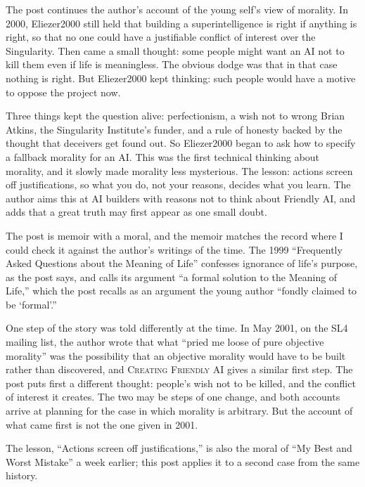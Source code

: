 \begin{afterword}
\summaryhead

The post continues the author's account of the young self's view of morality. In 2000, Eliezer2000 still held that building a superintelligence is right if anything is right, so that no one could have a justifiable conflict of interest over the Singularity. Then came a small thought: some people might want an AI not to kill them even if life is meaningless. The obvious dodge was that in that case nothing is right. But Eliezer2000 kept thinking: such people would have a motive to oppose the project now.

Three things kept the question alive: perfectionism, a wish not to wrong Brian Atkins, the Singularity Institute's funder, and a rule of honesty backed by the thought that deceivers get found out. So Eliezer2000 began to ask how to specify a fallback morality for an AI. This was the first technical thinking about morality, and it slowly made morality less mysterious. The lesson: actions screen off justifications, so what you do, not your reasons, decides what you learn. The author aims this at AI builders with reasons not to think about Friendly AI, and adds that a great truth may first appear as one small doubt.

\responsehead

The post is memoir with a moral, and the memoir matches the record where I could check it against the author's writings of the time. The 1999 ``Frequently Asked Questions about the Meaning of Life'' confesses ignorance of life's purpose, as the post says, and calls its argument ``a formal solution to the Meaning of Life,'' which the post recalls as an argument the young author ``fondly claimed to be `formal'.''

One step of the story was told differently at the time. In May 2001, on the SL4 mailing list, the author wrote that what ``pried me loose of pure objective morality'' was the possibility that an objective morality would have to be built rather than discovered, and \textsc{Creating Friendly AI} gives a similar first step. The post puts first a different thought: people's wish not to be killed, and the conflict of interest it creates. The two may be steps of one change, and both accounts arrive at planning for the case in which morality is arbitrary. But the account of what came first is not the one given in 2001.

The lesson, ``Actions screen off justifications,'' is also the moral of ``My Best and Worst Mistake'' a week earlier; this post applies it to a second case from the same history.


\end{afterword}
